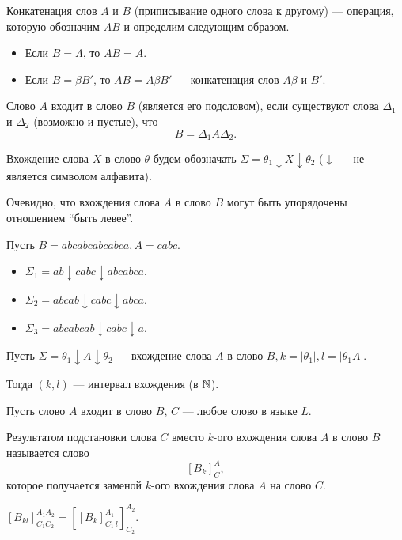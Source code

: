     \begin{Def}
        Конкатенация слов $A$ и $B$ (приписывание одного слова к другому) --- операция, которую обозначим $AB$ и определим следующим образом.
        \begin{itemize}
            \item Если $B = \Lambda$, то $A B = A$. 
            \item Если $B = \beta B'$, то $A B = A \beta B'$ --- конкатенация слов $A \beta$ и $B'$.
        \end{itemize}
    \end{Def}
    
    \begin{Def}
        Слово $A$ входит в слово $B$ (является его подсловом), если существуют слова $\Delta_1$ и $\Delta_2$ (возможно и пустые), что $$B = \Delta_1 A \Delta_2.$$
    \end{Def}

    \begin{Rem}
        Вхождение слова $X$ в слово $\theta$ будем обозначать $\Sigma = \theta_1 \downarrow X \downarrow \theta_2$ ($\downarrow$ --- не является символом алфавита).
    \end{Rem}

    \begin{Rem}
        Очевидно, что вхождения слова $A$ в слово $B$ могут быть упорядочены отношением ``быть левее''.
    \end{Rem}

    \begin{Example}
        Пусть $B = abcabcabcabca, A = cabc$.
        \begin{itemize}
            \item $\Sigma_1 = ab \downarrow cabc \downarrow abcabca$.
            \item $\Sigma_2 = abcab \downarrow cabc \downarrow abca$.
            \item $\Sigma_3 = abcabcab \downarrow cabc \downarrow a$.
        \end{itemize}
    \end{Example}
    
    \begin{Def}
        Пусть $\Sigma = \theta_1 \downarrow A \downarrow \theta_2$ --- вхождение слова $A$ в слово $B, k = |\theta_1|, l = |\theta_1 A|$.

        Тогда $(k, l)$ --- интервал вхождения (в $\mathbb{N}$).
    \end{Def}

    \begin{Def}[Подстановка]
        Пусть слово $A$ входит в слово $B$, $C$ --- любое слово в языке $L$.

        Результатом подстановки слова $C$ вместо $k$-ого вхождения слова $A$ в слово $B$ называется слово 
        $$[B_k]^A_C,$$ которое получается заменой $k$-ого вхождения слова $A$ на слово $C$. 
    \end{Def}

    \begin{Rem}
        $[B_{kl}]^{A_1 A_2}_{C_1 C_2} = [[B_k]^{A_1}_{C_1 \ l}]^{A_2}_{C_2}$.
    \end{Rem}
